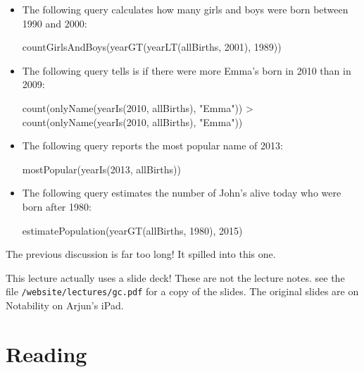 \documentclass[9pt]{extbook}
\begin{document}
\begin{itemize}

  \item The following query calculates how many girls and boys were born between 1990
  and 2000:

  \begin{scalacode}
  countGirlsAndBoys(yearGT(yearLT(allBirths, 2001), 1989))
  \end{scalacode}

  \item The following query tells is if there were more Emma's born in 2010 than
  in 2009:

  \begin{scalacode}
  count(onlyName(yearIs(2010, allBirths), "Emma")) > count(onlyName(yearIs(2010, allBirths), "Emma"))
  \end{scalacode}

  \item The following query reports the most popular name of 2013:

  \begin{scalacode}
  mostPopular(yearIs(2013, allBirths))
  \end{scalacode}

  \item The following query estimates the number of John's alive today who
  were born after 1980:

  \begin{scalacode}
  estimatePopulation(yearGT(allBirths, 1980), 2015)
  \end{scalacode}

\end{itemize}




The previous discussion is far too long! It spilled into this one.




\newlecture

This lecture actually uses a slide deck! These are not the lecture notes.
see the file \texttt{/website/lectures/gc.pdf} for a copy of the slides.
The original slides are on Notability on Arjun's iPad.



\newlecture

\section{Reading}
\end{document}
